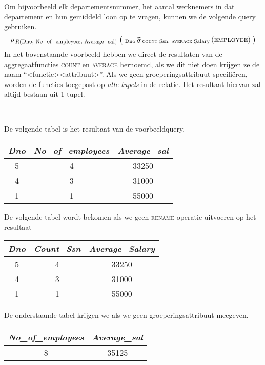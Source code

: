 Om bijvoorbeeld elk departementsnummer, het aantal werknemers in dat departement en hun gemiddeld loon op te vragen, kunnen we de volgende query gebruiken.
\vspace{-2mm}
\[ \rho_{\,R( \text{Dno, No\_of\_employees, Average\_sal} )} \;\big( ~_{\text{Dno}} \,\mathfrak{F}_{\, \text{\textsc{count} Ssn, \textsc{average} Salary}} \,(\textsc{employee}) \;\big) \]
In het bovenstaande voorbeeld hebben we direct de resultaten van de aggregaatfuncties \textsc{count} en \textsc{average} hernoemd, als we dit niet doen krijgen ze de naam ``{\textless}functie{\textgreater}\underline{\hspace{4mm}}{\textless}attribuut{\textgreater}''. Als we geen groeperingsattribuut specifi\"eren, worden de functies toegepast op \textit{alle tupels} in de relatie. Het resultaat hiervan zal altijd bestaan uit 1 tupel.

~

\noindent De volgende tabel is het resultaat van de voorbeeldquery.
\begin{center}
\begin{tabular}{|c|c|c|}
\hline
\textit{Dno} & \textit{No\_of\_employees} & \textit{Average\_sal} \\ \hline
5 & 4 & 33250\\ \hline
4 & 3 & 31000\\ \hline
1 & 1 & 55000\\
\hline
\end{tabular}
\end{center}
\vspace{4mm}
De volgende tabel wordt bekomen als we geen \textsc{rename}-operatie uitvoeren op het resultaat
\begin{center}
\begin{tabular}{|c|c|c|}
\hline
\textit{Dno} & \textit{Count\_Ssn} & \textit{Average\_Salary} \\ \hline
5 & 4 & 33250\\ \hline
4 & 3 & 31000\\ \hline
1 & 1 & 55000\\
\hline
\end{tabular}
\end{center}
\vspace{4mm}
De onderstaande tabel krijgen we als we geen groeperingsattribuut meegeven.
\begin{center}
\begin{tabular}{|c|c|}
\hline
\textit{No\_of\_employees} & \textit{Average\_sal} \\ \hline
8 & 35125\\
\hline
\end{tabular}
\end{center}


